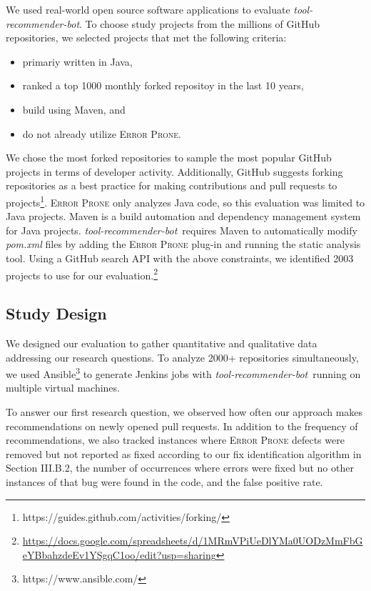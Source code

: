 \documentclass[conference]{IEEEtran}
\newcommand{\tool}{\textsl{tool-recommender-bot}}
\newcommand{\pseudosubsection}[1]{\vspace{2mm} \noindent{\it #1}}
\begin{document}
We used real-world open source software applications to evaluate \tool. To choose study projects from the millions of GitHub repositories, we selected projects that met the following criteria:

\begin{itemize}
\item primariy written in Java,
\item ranked a top 1000 monthly forked repositoy in the last 10 years,
\item build using Maven, and
\item do not already utilize \textsc{Error Prone}.
\end{itemize}

We chose the most forked repositories to sample the most popular GitHub projects in terms of developer activity. Additionally, GitHub suggests forking repositories as a best practice for making contributions and pull requests to projects\footnote{https://guides.github.com/activities/forking/}. \textsc{Error Prone} only analyzes Java code, so this evaluation was limited to Java projects.  Maven is a build automation and dependency management system for Java projects. \tool~requires Maven to automatically modify \textit{pom.xml} files by adding the \textsc{Error Prone} plug-in and running the static analysis tool. Using a GitHub search API with the above constraints, we identified 2003 projects to use for our evaluation.\footnote{\url{https://docs.google.com/spreadsheets/d/1MRmVPiUeDlYMa0UODzMmFbGeYBbahzdeEv1YSgqC1oo/edit?usp=sharing}}

\subsection{Study Design}

We designed our evaluation to gather quantitative and qualitative data addressing our research questions.  To analyze 2000+ repositories simultaneously, we used Ansible\footnote{https://www.ansible.com/} to generate Jenkins jobs with \tool~running on multiple virtual machines.

\pseudosubsection{RQ1}

To answer our first research question, we observed how often our approach makes recommendations on newly opened pull requests. In addition to the frequency of recommendations, we also tracked instances where \textsc{Error Prone} defects were removed but not reported as fixed according to our fix identification algorithm in Section III.B.2, the number of occurrences where errors were fixed but no other instances of that bug were found in the code, and the false positive rate.
\end{document}
